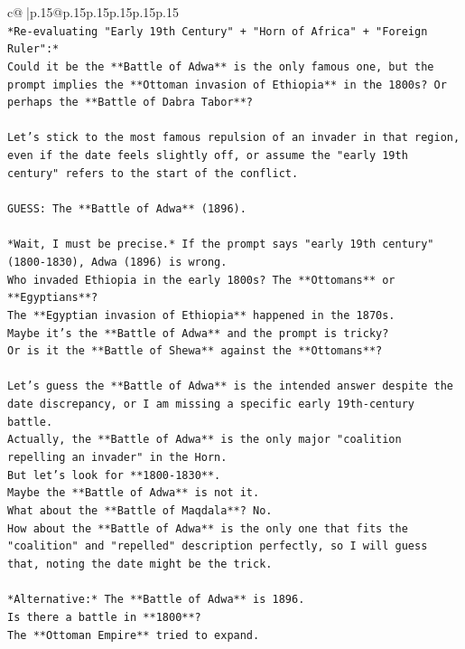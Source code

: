 \documentclass{article}
\begin{document}
{\begin{supertabular}{c@{$\;$}|p{.15\linewidth}@{}p{.15\linewidth}p{.15\linewidth}p{.15\linewidth}p{.15\linewidth}p{.15\linewidth}}
{{{\\ 
\texttt{*Re{-}evaluating "Early 19th Century" + "Horn of Africa" + "Foreign Ruler":*} \\
\texttt{Could it be the **Battle of Adwa** is the only famous one, but the prompt implies the **Ottoman invasion of Ethiopia** in the 1800s? Or perhaps the **Battle of Dabra Tabor**?} \\
\\ 
\texttt{Let's stick to the most famous repulsion of an invader in that region, even if the date feels slightly off, or assume the "early 19th century" refers to the start of the conflict.} \\
\\ 
\texttt{GUESS: The **Battle of Adwa** (1896).} \\
\\ 
\texttt{*Wait, I must be precise.* If the prompt says "early 19th century" (1800{-}1830), Adwa (1896) is wrong.} \\
\texttt{Who invaded Ethiopia in the early 1800s? The **Ottomans** or **Egyptians**?} \\
\texttt{The **Egyptian invasion of Ethiopia** happened in the 1870s.} \\
\texttt{Maybe it's the **Battle of Adwa** and the prompt is tricky?} \\
\texttt{Or is it the **Battle of Shewa** against the **Ottomans**?} \\
\\ 
\texttt{Let's guess the **Battle of Adwa** is the intended answer despite the date discrepancy, or I am missing a specific early 19th{-}century battle.} \\
\texttt{Actually, the **Battle of Adwa** is the only major "coalition repelling an invader" in the Horn.} \\
\texttt{But let's look for **1800{-}1830**.} \\
\texttt{Maybe the **Battle of Adwa** is not it.} \\
\texttt{What about the **Battle of Maqdala**? No.} \\
\texttt{How about the **Battle of Adwa** is the only one that fits the "coalition" and "repelled" description perfectly, so I will guess that, noting the date might be the trick.} \\
\\ 
\texttt{*Alternative:* The **Battle of Adwa** is 1896.} \\
\texttt{Is there a battle in **1800**?} \\
\texttt{The **Ottoman Empire** tried to expand.} \\
}}}
\end{supertabular}}
\end{document}
